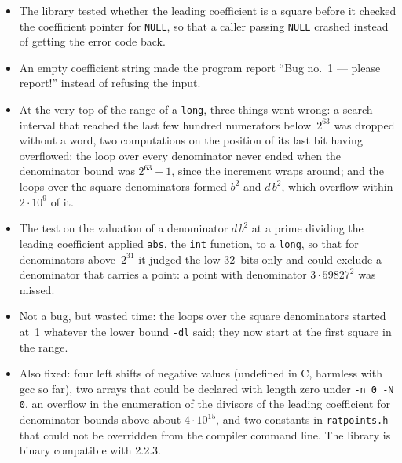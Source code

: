 \documentclass[12pt,a4paper,oneside]{amsart}
\begin{document}
\begin{itemize}
        of the others, which loses points. The program no longer writes either,
        and the manual now says exactly which fields it does set;
        \texttt{make test1once} runs the test curves with the structure filled
        once, and \texttt{make test3} runs one or more invocations of
        \texttt{ratpoints} per bug against a reference.
  \item The library tested whether the leading coefficient is a square before
        it checked the coefficient pointer for \texttt{NULL}, so that a caller
        passing \texttt{NULL} crashed instead of getting the error code back.
  \item An empty coefficient string made the program report
        ``Bug no.~1 --- please report!'' instead of refusing the input.
  \item At the very top of the range of a \texttt{long}, three things went
        wrong: a search interval that reached the last few hundred numerators
        below~$2^{63}$ was dropped without a word, two computations on the
        position of its last bit having overflowed; the loop over every
        denominator never ended when the denominator bound was $2^{63}-1$,
        since the increment wraps around; and the loops over the square
        denominators formed $b^2$ and $d\,b^2$, which overflow within
        $2\cdot10^9$ of it.
  \item The test on the valuation of a denominator $d\,b^2$ at a prime
        dividing the leading coefficient applied \texttt{abs}, the
        \texttt{int} function, to a \texttt{long}, so that for denominators
        above~$2^{31}$ it judged the low 32~bits only and could exclude a
        denominator that carries a point: a point with denominator
        $3\cdot 59827^2$ was missed.
  \item Not a bug, but wasted time: the loops over the square denominators
        started at~1 whatever the lower bound \verb+-dl+ said; they now start
        at the first square in the range.
  \item Also fixed: four left shifts of negative values
        (undefined in C, harmless with gcc so far), two arrays that could be
        declared with length zero under \verb+-n 0 -N 0+, an overflow in the
        enumeration of the divisors of the leading coefficient for denominator
        bounds above about $4\cdot10^{15}$, and two constants in
        \texttt{ratpoints.h} that could not be overridden from the compiler
        command line. The library is binary compatible with 2.2.3.
\end{itemize}
\end{document}
